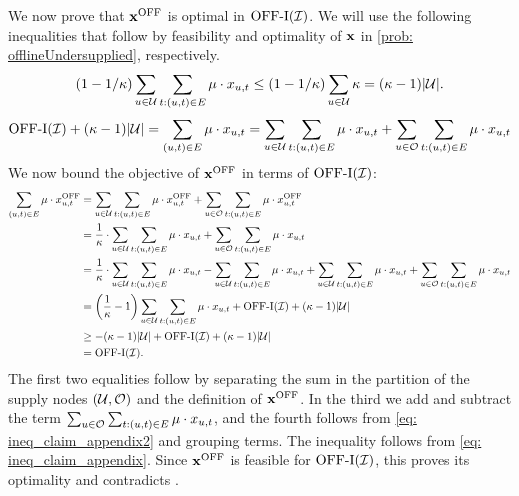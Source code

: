 {    We now prove that $\mathbf{x}^{\mathrm{OFF}}$ is optimal in $\mathrm{\mathrm{OFF}}\textrm{-}\mathrm{I}(\mathcal I)$. We will use the following inequalities that follow by feasibility and optimality of $\mathbf{x}$ in \ref{prob: offlineUndersupplied}, respectively.
    \begin{equation}
        \label{eq: ineq_claim_appendix}
        \left(1 - 1/\kappa \right) \sum_{u \in \mathcal U }\sum_{t: (u,t) \in E} \mu \cdot x_{u,t} \leq \left(1 - 1/\kappa \right) \sum_{u \in \mathcal U } \kappa = (\kappa -1)|\mathcal U|.
    \end{equation}
    \begin{equation}
    \label{eq: ineq_claim_appendix2}
        \mathrm{\mathrm{OFF}}\textrm{-}\mathrm{I}(\mathcal I) + (\kappa-1)|\mathcal U| = \sum_{(u,t) \in E} \mu \cdot x_{u,t} = \sum_{u \in \mathcal U} \sum_{t: (u,t) \in E} \mu \cdot x_{u,t} + \sum_{u \in \mathcal O} \sum_{t: (u,t) \in E} \mu \cdot x_{u,t}
    \end{equation}
    {We now bound the objective of $\mathbf{x}^{\mathrm{OFF}}$ in terms of $\mathrm{\mathrm{OFF}}\textrm{-}\mathrm{I}(\mathcal I)$}: 
    \begin{align*}
        \sum_{(u,t) \in E} \mu \cdot x^{\mathrm{OFF}}_{u,t} &= \sum_{u \in \mathcal U} \sum_{t: (u,t) \in E} \mu \cdot x^{\mathrm{OFF}}_{u,t} + \sum_{u \in \mathcal O} \sum_{t: (u,t) \in E} \mu \cdot x^{\mathrm{OFF}}_{u,t}\\
        &= \frac{1}{\kappa} \cdot \sum_{u \in \mathcal U} \sum_{t: (u,t) \in E} \mu \cdot x_{u,t} + \sum_{u \in \mathcal O} \sum_{t: (u,t) \in E} \mu \cdot x_{u,t}\\
        &= \frac{1}{\kappa} \cdot \sum_{u \in \mathcal U} \sum_{t: (u,t) \in E} \mu \cdot x_{u,t} - \sum_{u \in \mathcal U} \sum_{t: (u,t) \in E} \mu \cdot x_{u,t} + \sum_{u \in \mathcal U} \sum_{t: (u,t) \in E} \mu \cdot x_{u,t} + \sum_{u \in \mathcal O} \sum_{t: (u,t) \in E} \mu \cdot x_{u,t}\\
        &= \left( \frac{1}{\kappa} - 1 \right) \sum_{u \in \mathcal U} \sum_{t: (u,t) \in E} \mu \cdot x_{u,t} + \mathrm{\mathrm{OFF}}\textrm{-}\mathrm{I}(\mathcal I) + (\kappa-1)|\mathcal U|\\
        &\geq -(\kappa-1)|\mathcal U| + \mathrm{\mathrm{OFF}}\textrm{-}\mathrm{I}(\mathcal I)+(\kappa-1)|\mathcal U|\\
        &= \mathrm{\mathrm{OFF}}\textrm{-}\mathrm{I}(\mathcal I).
    \end{align*}
    The first two equalities follow by separating the sum in the partition of the supply nodes $(\mathcal U, \mathcal O)$ and the definition of $\mathbf{x}^{\mathrm{OFF}}$. {In the third we add and subtract the term $\sum_{u \in \mathcal O} \sum_{t: (u,t) \in E} \mu \cdot x_{u,t}$, and the fourth  follows from \cref{eq: ineq_claim_appendix2} and grouping terms}. The inequality follows {from \cref{eq: ineq_claim_appendix}}. Since $\mathbf{x}^{\mathrm{OFF}}$ {is feasible for $\mathrm{\mathrm{OFF}}\textrm{-}\mathrm{I}(\mathcal I)$, this proves its optimality and contradicts }.

}
